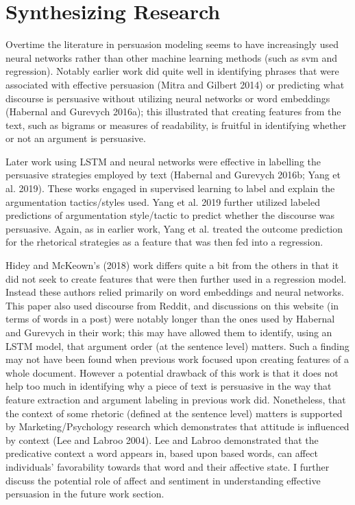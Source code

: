 \documentclass[11pt,a4paper]{article}
\begin{document}


\section{Synthesizing Research}
Overtime the literature in persuasion modeling seems to have increasingly used neural networks rather than other machine learning methods (such as svm and regression). Notably earlier work did quite well in identifying phrases that were associated with effective persuasion (Mitra and Gilbert 2014) or predicting what discourse is persuasive without utilizing neural networks or word embeddings (Habernal and Gurevych 2016a); this illustrated that creating features from the text, such as bigrams or measures of readability, is fruitful in identifying whether or not an argument is persuasive.

Later work using LSTM and neural networks were effective in labelling the persuasive strategies employed by text (Habernal and Gurevych 2016b; Yang et al. 2019). These works engaged in supervised learning to label and explain the argumentation tactics/styles used. Yang et al. 2019 further utilized labeled predictions of argumentation style/tactic to predict whether the discourse was persuasive. Again, as in earlier work, Yang et al. treated the outcome prediction for the rhetorical strategies as a feature that was then fed into a regression.
 
 Hidey and McKeown's (2018) work differs quite a bit from the others in that it did not seek to create features that were then further used in a regression model. Instead these authors relied primarily on word embeddings and neural networks. This paper also used discourse from Reddit, and discussions on this website (in terms of words in a post) were notably longer than the ones used by Habernal and Gurevych in their work; this may have allowed them to identify, using an LSTM model, that argument order (at the sentence level) matters. Such a finding may not have been found when previous work focused upon creating features of a whole document. However a potential drawback of this work is that it does not help too much in identifying why a piece of text is persuasive in the way that feature extraction and argument labeling in previous work did. Nonetheless, that the context of some rhetoric (defined at the  sentence level) matters is supported by Marketing/Psychology research which demonstrates that attitude is influenced by context (Lee and Labroo 2004). Lee and Labroo demonstrated that the predicative context a word appears in, based upon based words, can affect individuals' favorability towards that word and their affective state. I further discuss the potential role of affect and sentiment in understanding effective persuasion in the future work section.
\end{document}
